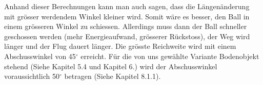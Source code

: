 \noindent
Anhand dieser Berechnungen kann man auch sagen, dass die Längenänderung mit 
grösser werdendem Winkel kleiner wird. Somit wäre es besser, den Ball in einem 
grösseren Winkel zu schiessen. Allerdings muss dann der Ball schneller 
geschossen werden (mehr Energieaufwand, grösserer Rückstoss), der Weg wird 
länger und der Flug dauert länger. Die grösste Reichweite wird mit einem Abschusswinkel 
von 45$^\circ$ erreicht. Für die von uns gewählte Variante Bodenobjekt stehend (Siehe Kapitel
5.4 und Kapitel 6.) wird der Abschusswinkel voraussichtlich 50$^\circ$ betragen (Siehe Kapitel 8.1.1).

